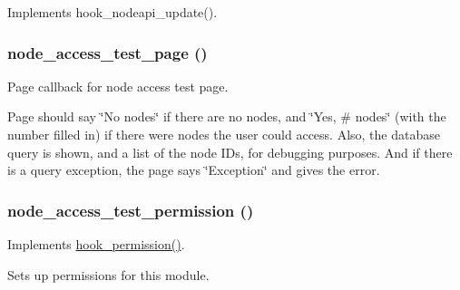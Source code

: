 Implements hook\_\-nodeapi\_\-update(). \hypertarget{node__access__test_8module_a7d5ba9d1824c59f68cc2dfc2b9758487}{
\subsubsection[{node\_\-access\_\-test\_\-page}]{\setlength{\rightskip}{0pt plus 5cm}node\_\-access\_\-test\_\-page ()}}
\label{node__access__test_8module_a7d5ba9d1824c59f68cc2dfc2b9758487}
Page callback for node access test page.

Page should say \char`\"{}No nodes\char`\"{} if there are no nodes, and \char`\"{}Yes, \# nodes\char`\"{} (with the number filled in) if there were nodes the user could access. Also, the database query is shown, and a list of the node IDs, for debugging purposes. And if there is a query exception, the page says \char`\"{}Exception\char`\"{} and gives the error. \hypertarget{node__access__test_8module_a502abc1d3e08ab60a5643b058181f068}{
\subsubsection[{node\_\-access\_\-test\_\-permission}]{\setlength{\rightskip}{0pt plus 5cm}node\_\-access\_\-test\_\-permission ()}}
\label{node__access__test_8module_a502abc1d3e08ab60a5643b058181f068}
Implements \hyperlink{group__hooks_ga2b22b45f4925f2478412477bae329713}{hook\_\-permission()}.

Sets up permissions for this module. 